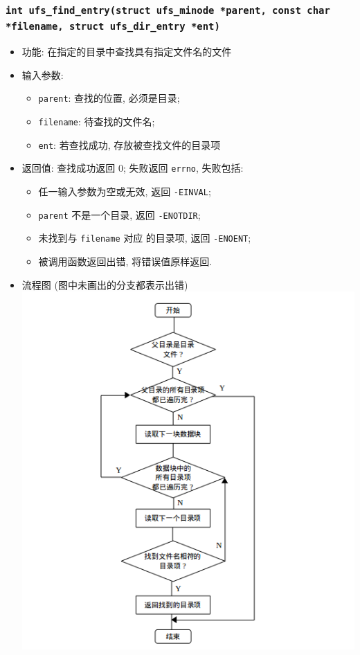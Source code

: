\documentclass[nofonts]{ctexart}
\begin{document}
  \subsubsection{\texttt{int ufs\_find\_entry(struct ufs\_minode *parent, const char *filename, struct ufs\_dir\_entry *ent)}}
  \begin{itemize}
\item
  功能: 在指定的目录中查找具有指定文件名的文件
\item
  输入参数:

  \begin{itemize}
  \item
    \texttt{parent}: 查找的位置, 必须是目录;
  \item
    \texttt{filename}: 待查找的文件名;
  \item
    \texttt{ent}: 若查找成功, 存放被查找文件的目录项
  \end{itemize}
\item
  返回值: 查找成功返回 0; 失败返回 \texttt{errno}, 失败包括:

  \begin{itemize}
  \item
    任一输入参数为空或无效, 返回 \texttt{-EINVAL};
  \item
    \texttt{parent} 不是一个目录, 返回 \texttt{-ENOTDIR};
  \item
    未找到与 \texttt{filename} 对应 的目录项, 返回 \texttt{-ENOENT};
  \item
    被调用函数返回出错, 将错误值原样返回.
  \end{itemize}
\item
  流程图 (图中未画出的分支都表示出错)\\
  \includegraphics[width=15cm]{./images/find_entry.png}
  \end{itemize}
\end{document}
